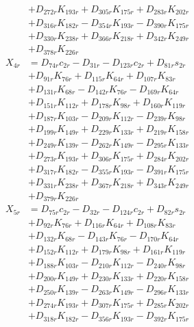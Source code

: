 \begin{multicols}{2}
\begin{align}
&+ D_{272r}K_{193r} + D_{305r}K_{175r} + D_{283r}K_{202r}  \nonumber \\
&+ D_{316r}K_{182r} - D_{354r}K_{193r} - D_{390r}K_{175r}  \nonumber \\
&+ D_{330r}K_{238r} + D_{366r}K_{218r} + D_{342r}K_{249r}  \nonumber \\
&+ D_{378r}K_{226r} \nonumber \\
X_{4r} &= D_{74r}c_{2r} - D_{31r} - D_{123r}c_{2r} + D_{81r}s_{2r}  \nonumber \\
&+ D_{91r}K_{76r} + D_{115r}K_{64r} + D_{107r}K_{83r}  \nonumber \\
&+ D_{131r}K_{68r} - D_{142r}K_{76r} - D_{169r}K_{64r}  \nonumber \\
&+ D_{151r}K_{112r} + D_{178r}K_{98r} + D_{160r}K_{119r}  \nonumber \\
&+ D_{187r}K_{103r} - D_{209r}K_{112r} - D_{239r}K_{98r}  \nonumber \\
&+ D_{199r}K_{149r} + D_{229r}K_{133r} + D_{219r}K_{158r}  \nonumber \\
&+ D_{249r}K_{139r} - D_{262r}K_{149r} - D_{295r}K_{133r}  \nonumber \\
&+ D_{273r}K_{193r} + D_{306r}K_{175r} + D_{284r}K_{202r}  \nonumber \\
&+ D_{317r}K_{182r} - D_{355r}K_{193r} - D_{391r}K_{175r}  \nonumber \\
&+ D_{331r}K_{238r} + D_{367r}K_{218r} + D_{343r}K_{249r}  \nonumber \\
&+ D_{379r}K_{226r} \nonumber \\
X_{5r} &= D_{75r}c_{2r} - D_{32r} - D_{124r}c_{2r} + D_{82r}s_{2r}  \nonumber \\
&+ D_{92r}K_{76r} + D_{116r}K_{64r} + D_{108r}K_{83r}  \nonumber \\
&+ D_{132r}K_{68r} - D_{143r}K_{76r} - D_{170r}K_{64r}  \nonumber \\
&+ D_{152r}K_{112r} + D_{179r}K_{98r} + D_{161r}K_{119r}  \nonumber \\
&+ D_{188r}K_{103r} - D_{210r}K_{112r} - D_{240r}K_{98r}  \nonumber \\
&+ D_{200r}K_{149r} + D_{230r}K_{133r} + D_{220r}K_{158r}  \nonumber \\
&+ D_{250r}K_{139r} - D_{263r}K_{149r} - D_{296r}K_{133r}  \nonumber \\
&+ D_{274r}K_{193r} + D_{307r}K_{175r} + D_{285r}K_{202r}  \nonumber \\
&+ D_{318r}K_{182r} - D_{356r}K_{193r} - D_{392r}K_{175r}  \nonumber \\

\end{align}
\end{multicols}
